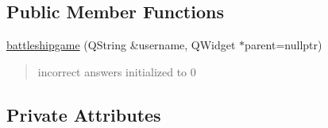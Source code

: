 \subsection*{Public Member Functions}
\begin{DoxyCompactItemize}
\item 
\hyperlink{classbattleshipgame_a47d39ce6859afe84cceedd678b9252d7}{battleshipgame} (Q\+String \&username, Q\+Widget $\ast$parent=nullptr)
\begin{DoxyCompactList}\small\item\em \begin{quote}
incorrect answers initialized to 0 \end{quote}
\end{DoxyCompactList}\end{DoxyCompactItemize}
\subsection*{Private Attributes}
